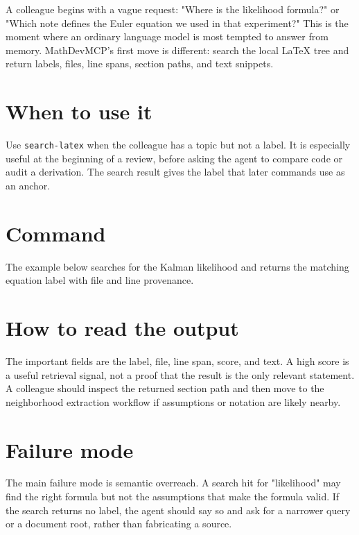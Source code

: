 \documentclass[12pt,a4paper,openany]{book}
\begin{document}
A colleague begins with a vague request: "Where is the likelihood formula?" or
"Which note defines the Euler equation we used in that experiment?" This is the
moment where an ordinary language model is most tempted to answer from memory.
MathDevMCP's first move is different: search the local LaTeX tree and return
labels, files, line spans, section paths, and text snippets.

\section*{When to use it}

Use \texttt{search-latex} when the colleague has a topic but not a label. It is
especially useful at the beginning of a review, before asking the agent to
compare code or audit a derivation. The search result gives the label that later
commands use as an anchor.

\section*{Command}

The example below searches for the Kalman likelihood and returns the matching
equation label with file and line provenance.



\section*{How to read the output}

The important fields are the label, file, line span, score, and text. A high
score is a useful retrieval signal, not a proof that the result is the only
relevant statement. A colleague should inspect the returned section path and
then move to the neighborhood extraction workflow if assumptions or notation are
likely nearby.

\section*{Failure mode}

The main failure mode is semantic overreach. A search hit for "likelihood" may
find the right formula but not the assumptions that make the formula valid. If
the search returns no label, the agent should say so and ask for a narrower
query or a document root, rather than fabricating a source.
\end{document}
